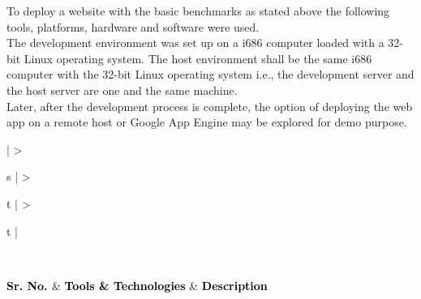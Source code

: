 \documentclass[hidelinks,a4paper,12pt]{article}
\begin{document}
\noindent
To deploy a website with the basic benchmarks as stated above the following tools, platforms, hardware and software were used.
\\

The development environment was set up on a \gls{i686} computer loaded with a 32-bit \Gls{Linux} operating system. The host environment shall be the same \gls{i686} computer with the 32-bit \Gls{Linux} operating system i.e., the development server and the host server are one and the same machine.
\\

Later, after the development process is complete, the option of deploying the web app on a remote host or Google App Engine may be explored for demo purpose.

\bigskip

\noindent
\begin{center}
	{
	\setlength{\extrarowheight}{2pt}

	\newcolumntype{b}{X}
		
	\vspace{0.25cm}
									
	\begin{tabularx}{\textwidth}{ | >{\ttfamily\raggedright\arraybackslash} s 
	| >{\ttfamily\raggedright\arraybackslash} t 
	| >{\ttfamily\raggedright\arraybackslash} t | }
								
	\caption{ \textbf {\small {Software \& Hardware Requirements}}} \\

	\hline
								
	{\textbf{\textcolor{black}{{Sr. No.} \newline}}} & {\textbf{\textcolor{black}{ {Tools \& Technologies}}}} & \textbf{\textcolor{black}{ {Description}}} \\
								

\end{tabularx}}
\end{center}
\end{document}

